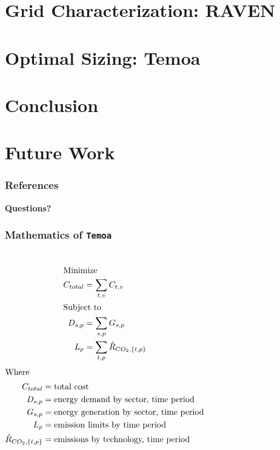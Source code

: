 \documentclass[9pt]{beamer}
\begin{document}
\section{Grid Characterization: RAVEN}

\section{Optimal Sizing: Temoa}

\section{Conclusion}

\section{Future Work}


\begin{frame}[allowframebreaks]
  \frametitle{References}
  
  {\footnotesize  }

\end{frame}
\begin{frame}
  \begin{center}
    \Huge{\textbf{Questions?}}
  \end{center}
\end{frame}


\begin{frame}
  \frametitle{Mathematics of \texttt{Temoa}}
  \begin{columns}
    \column[t]{3cm}
    \begin{align}
      \intertext{Minimize}
      C_{total} &= \sum_{t, v}C_{t, v}\\
      \intertext{Subject to}
      D_{s,p} &= \sum_{s,p}G_{s,p}\nonumber\\
      L_{p} &= \sum_{t,p}\hat{R}_{CO_2,\{t,p\}}\nonumber
    \end{align}
    \column[t]{4cm}
    \begin{align}
      \intertext{Where}
      C_{total} &= \text{total cost}\nonumber\\
      D_{s,p} &= \text{energy demand by sector, time period}\nonumber\\
      G_{s,p} &= \text{energy generation by sector, time period}\nonumber\\
      L_{p} &= \text{emission limits by time period}\nonumber\\
      \hat{R}_{CO_2,\{t,p\}} &= \text{emissions by technology, time period}\nonumber
    \end{align}
  \end{columns}
\end{frame}

\end{document}

